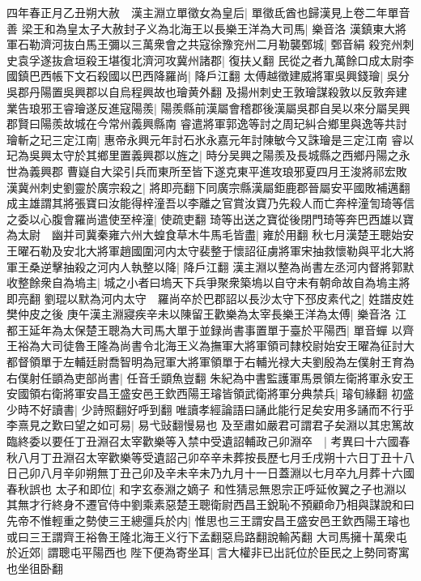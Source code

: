 四年春正月乙丑朔大赦　漢主淵立單徵女為皇后|{
	單徵氐酋也歸漢見上卷二年單音善}
梁王和為皇太子大赦封子义為北海王以長樂王洋為大司馬|{
	樂音洛}
漢鎮東大將軍石勒濟河抜白馬王彌以三萬衆會之共寇徐豫兖州二月勒襲鄄城|{
	鄄音絹}
殺兖州刺史袁孚遂抜倉垣殺王堪復北濟河攻冀州諸郡|{
	復扶乂翻}
民從之者九萬餘口成太尉李國鎮巴西帳下文石殺國以巴西降羅尚|{
	降戶江翻}
太傅越徵建威將軍吳興錢璯|{
	吳分吳郡丹陽置吳興郡以自烏程興故也璯黄外翻}
及揚州刺史王敦璯謀殺敦以反敦奔建業告琅邪王睿璯遂反進寇陽羨|{
	陽羨縣前漢屬會稽郡後漢屬吳郡自吴以來分屬吴興郡賢曰陽羨故城在今常州義興縣南}
睿遣將軍郭逸等討之周玘糾合鄉里與逸等共討璯斬之玘三定江南|{
	惠帝永興元年討石氷永嘉元年討陳敏今又誅璯是三定江南}
睿以玘為吳興太守於其鄉里置義興郡以旌之|{
	時分吴興之陽羨及長城縣之西鄉丹陽之永世為義興郡}
曹嶷自大梁引兵而東所至皆下遂克東平進攻琅邪夏四月王浚將祁宏敗漢冀州刺史劉靈於廣宗殺之|{
	將即亮翻下同廣宗縣漢屬鉅鹿郡晉屬安平國敗補邁翻}
成主雄謂其將張寶曰汝能得梓潼吾以李離之官賞汝寶乃先殺人而亡奔梓潼訇琦等信之委以心腹會羅尚遣使至梓潼|{
	使疏吏翻}
琦等出送之寶從後閉門琦等奔巴西雄以寶為太尉　幽并司冀秦雍六州大蝗食草木牛馬毛皆盡|{
	雍於用翻}
秋七月漢楚王聰始安王曜石勒及安北大將軍趙國圍河内太守裴整于懷詔征虜將軍宋抽救懷勒與平北大將軍王桑逆擊抽殺之河内人執整以降|{
	降戶江翻}
漢主淵以整為尚書左丞河内督將郭默收整餘衆自為塢主|{
	城之小者曰塢天下兵爭聚衆築塢以自守未有朝命故自為塢主將即亮翻}
劉琨以默為河内太守　羅尚卒於巴郡詔以長沙太守下邳皮素代之|{
	姓譜皮姓樊仲皮之後}
庚午漢主淵寢疾辛未以陳留王歡樂為太宰長樂王洋為太傅|{
	樂音洛}
江都王延年為太保楚王聰為大司馬大單于並録尚書事置單于臺於平陽西|{
	單音蟬}
以齊王裕為大司徒魯王隆為尚書令北海王义為撫軍大將軍領司隸校尉始安王曜為征討大都督領單于左輔廷尉喬智明為冠軍大將軍領單于右輔光禄大夫劉殷為左僕射王育為右僕射任顗為吏部尚書|{
	任音壬顗魚豈翻}
朱紀為中書監護軍馬景領左衛將軍永安王安國領右衛將軍安昌王盛安邑王欽西陽王璿皆領武衛將軍分典禁兵|{
	璿旬緣翻}
初盛少時不好讀書|{
	少詩照翻好呼到翻}
唯讀孝經論語曰誦此能行足矣安用多誦而不行乎李熹見之歎曰望之如可易|{
	易弋䜴翻慢易也}
及至肅如嚴君可謂君子矣淵以其忠篤故臨終委以要任丁丑淵召太宰歡樂等入禁中受遺詔輔政己卯淵卒　|{
	考異曰十六國春秋八月丁丑淵召太宰歡樂等受遺詔己卯卒辛未葬按長歷七月壬戌朔十六日丁丑十八日己卯八月辛卯朔無丁丑己卯及辛未辛未乃九月十一日蓋淵以七月卒九月葬十六國春秋誤也}
太子和即位|{
	和字玄泰淵之嫡子}
和性猜忌無恩宗正呼延攸翼之子也淵以其無才行終身不遷官侍中劉乘素惡楚王聰衛尉西昌王銳恥不預顧命乃相與謀說和曰先帝不惟輕重之勢使三王總彊兵於内|{
	惟思也三王謂安昌王盛安邑王欽西陽王璿也或曰三王謂齊王裕魯王隆北海王义行下孟翻惡烏路翻說輸芮翻}
大司馬擁十萬衆屯於近郊|{
	謂聰屯平陽西也}
陛下便為寄坐耳|{
	言大權非已出託位於臣民之上勢同寄寓也坐徂卧翻}
